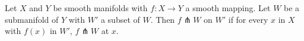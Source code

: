 Let $X$ and $Y$ be smooth manifolds with $f: X \to Y$ a smooth mapping. Let $W$ be a submanifold of $Y$ with $W'$ a subset of $W$. Then $f \pitchfork W$ on $W'$ if for every $x$ in $X$ with $f(x)$ in $W'$, $f \pitchfork W$ at $x$.